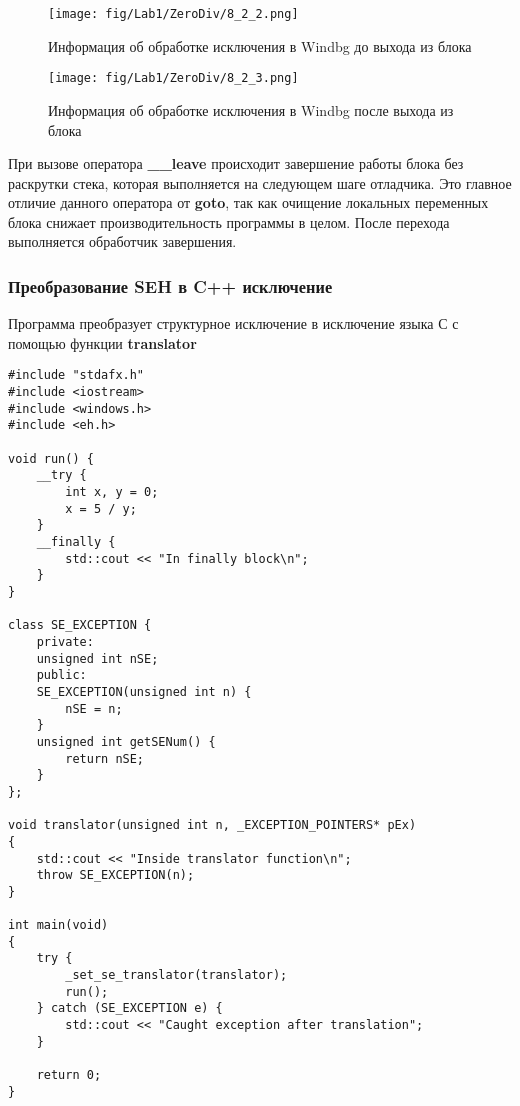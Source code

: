 \begin{figure}[H]
    \begin{center}
        \texttt{[image: fig/Lab1/ZeroDiv/8\_2\_2.png]}
        \caption{Информация об обработке исключения в Windbg до выхода из блока}
        \label{pic:8_2_2}
    \end{center}
\end{figure}

\begin{figure}[H]
    \begin{center}
        \texttt{[image: fig/Lab1/ZeroDiv/8\_2\_3.png]}
        \caption{Информация об обработке исключения в Windbg после выхода из блока}
        \label{pic:8_2_3}
    \end{center}
\end{figure}

При вызове оператора \textbf{\_\_leave} происходит завершение работы блока без раскрутки стека, которая выполняется на следующем шаге отладчика. Это главное отличие данного оператора от \textbf{goto}, так как очищение локальных переменных блока снижает производительность программы в целом. После перехода выполняется обработчик завершения.

\subsubsection{Преобразование SEH в C++ исключение}
Программа преобразует структурное исключение в исключение языка С с помощью функции \textbf{translator}
\begin{lstlisting}[caption=Преобразование SEH в исключение С++]
#include "stdafx.h"
#include <iostream>
#include <windows.h>
#include <eh.h>

void run() {
    __try {
        int x, y = 0;
        x = 5 / y;
    }
    __finally {
        std::cout << "In finally block\n";
    }
}

class SE_EXCEPTION {
    private:
    unsigned int nSE;
    public:
    SE_EXCEPTION(unsigned int n) {
        nSE = n;
    }
    unsigned int getSENum() {
        return nSE;
    }
};

void translator(unsigned int n, _EXCEPTION_POINTERS* pEx)
{
    std::cout << "Inside translator function\n";
    throw SE_EXCEPTION(n);
}

int main(void)
{
    try {
        _set_se_translator(translator);
        run();
    } catch (SE_EXCEPTION e) {
        std::cout << "Caught exception after translation";
    }

    return 0;
}
\end{lstlisting}

